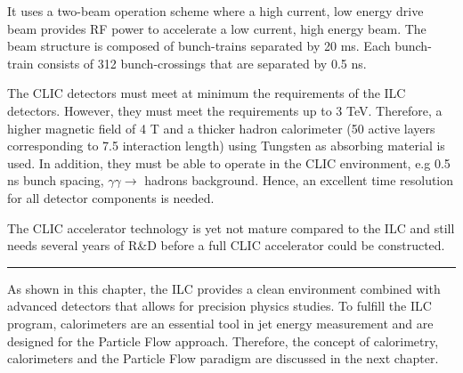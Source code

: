 It uses a two-beam operation scheme where a high current, low energy drive beam provides RF power to accelerate a low current, high energy beam. The beam structure is composed of bunch-trains separated by 20 ms. Each bunch-train consists of 312 bunch-crossings that are separated by 0.5 ns.

The CLIC detectors must meet at minimum the requirements of the ILC detectors. However, they must meet the requirements up to 3 TeV. Therefore, a higher magnetic field of 4 T and a thicker hadron calorimeter (50 active layers corresponding to 7.5 interaction length) using Tungsten as absorbing material is used. In addition, they must be able to operate in the CLIC environment, e.g 0.5 ns bunch spacing, $\gamma\gamma \rightarrow$ hadrons background. Hence, an excellent time resolution for all detector components is needed.

The CLIC accelerator technology is yet not mature compared to the ILC and still needs several years of R\&D before a full CLIC accelerator could be constructed.

\begin{center}
  \rule{0.5\textwidth}{.4pt}
\end{center}

As shown in this chapter, the ILC provides a clean environment combined with advanced detectors that allows for precision physics studies. To fulfill the ILC program, calorimeters are an essential tool in jet energy measurement and are designed for the Particle Flow approach. Therefore, the concept of calorimetry, calorimeters and the Particle Flow paradigm are discussed in the next chapter.
